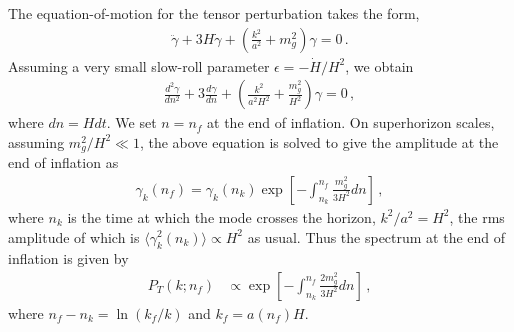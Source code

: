 \documentclass[tightenlines,floats,aps,nofootinbib,prd,onecolumn,preprintnumbers]{revtex4}
\begin{document}
The equation-of-motion for the tensor perturbation takes the form,
%
\begin{align}
\ddot\gamma+3H\dot\gamma+\left(\frac{k^2}{a^2}+m_g^2\right)\gamma=0\,.
\end{align}
%
Assuming a very small slow-roll parameter $\epsilon=-\dot H/H^2$, we obtain
%
\begin{align}
\frac{d^2\gamma}{dn^2}+3\frac{d\gamma}{dn}+\left(\frac{k^2}{a^2H^2}+
\frac{m_g^2}{H^2}\right)\gamma=0\,,
\end{align}
%
where $dn=Hdt$. We set $n=n_f$ at the end of inflation.
On superhorizon scales, assuming $m_g^2/H^2\ll1$, the above equation is solved
to give the amplitude at the end of inflation as
%
\begin{align}
\gamma_{k}(n_f)=\gamma_k(n_k)
\exp\left[-\int_{n_k}^{n_f}\frac{m_g^2}{3H^2}dn\right]\,,
\end{align}
%
where $n_k$ is the time at which the mode crosses the horizon,
$k^2/a^2=H^2$, the rms amplitude of which is 
$\langle\gamma_k^2(n_k)\rangle\propto H^2$ as usual.
Thus the spectrum at the end of inflation is given by
\begin{align}
%
P_T(k;n_f)
&\propto
\exp\left[-\int_{n_k}^{n_f}\frac{2m_g^2}{3H^2}dn\right]\,,
%
\end{align}
where $n_f-n_k=\ln(k_f/k)$ and $k_f=a(n_f)H$.
\end{document}
